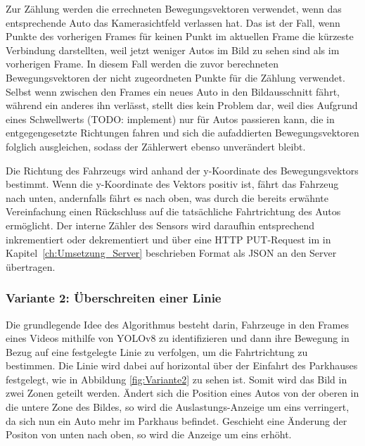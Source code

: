 Zur Zählung werden die errechneten Bewegungsvektoren verwendet, wenn das entsprechende Auto das Kamerasichtfeld verlassen hat.
Das ist der Fall, wenn Punkte des vorherigen Frames für keinen Punkt im aktuellen Frame die kürzeste Verbindung darstellten, weil jetzt weniger Autos im Bild zu sehen sind als im vorherigen Frame.
In diesem Fall werden die zuvor berechneten Bewegungsvektoren der nicht zugeordneten Punkte für die Zählung verwendet.
Selbst wenn zwischen den Frames ein neues Auto in den Bildausschnitt fährt, während ein anderes ihn verlässt, stellt dies kein Problem dar, weil dies Aufgrund eines Schwellwerts (TODO: implement) nur für Autos passieren kann, die in entgegengesetzte Richtungen fahren und sich die aufaddierten Bewegungsvektoren folglich ausgleichen, sodass der Zählerwert ebenso unverändert bleibt.

Die Richtung des Fahrzeugs wird anhand der y-Koordinate des Bewegungsvektors bestimmt.
Wenn die y-Koordinate des Vektors positiv ist, fährt das Fahrzeug nach unten, andernfalls fährt es nach oben, was durch die bereits erwähnte Vereinfachung einen Rückschluss auf die tatsächliche Fahrtrichtung des Autos ermöglicht.
Der interne Zähler des Sensors wird daraufhin entsprechend inkrementiert oder dekrementiert und über eine HTTP PUT-Request im in Kapitel~\ref{ch:Umsetzung_Server} beschrieben Format als JSON an den Server übertragen.

\subsubsection{Variante 2: Überschreiten einer Linie}\label{ch:Sensor_v2}

Die grundlegende Idee des Algorithmus besteht darin, Fahrzeuge in den Frames eines Videos mithilfe von YOLOv8 zu identifizieren und dann ihre Bewegung in Bezug auf eine festgelegte Linie zu verfolgen, um die Fahrtrichtung zu bestimmen.
Die Linie wird dabei auf horizontal über der Einfahrt des Parkhauses festgelegt, wie in Abbildung \ref{fig:Variante2} zu sehen ist.
Somit wird das Bild in zwei Zonen geteilt werden.
Ändert sich die Position eines Autos von der oberen in die untere Zone des Bildes, so wird die Auslastungs-Anzeige um eins verringert, da sich nun ein Auto mehr im Parkhaus befindet.
Geschieht eine Änderung der Positon von unten nach oben, so wird die Anzeige um eins erhöht.

